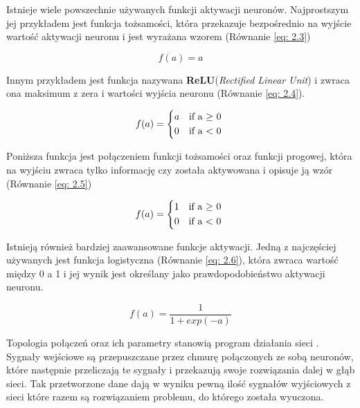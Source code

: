 \documentclass[12pt, oneside, a4paper]{report}
\begin{document}
Istnieje wiele powszechnie używanych funkcji aktywacji neuronów. Najprostszym jej przykładem jest funkcja tożsamości, która przekazuje bezpośrednio na wyjście wartość aktywacji neuronu i jest wyrażana wzorem (Równanie \ref{eq: 2.3})

\begin{equation}\label{eq: 2.3}
  f(a) = a
\end{equation}

Innym przykładem jest funkcja nazywana \textbf{ReLU}(\textit{Rectified Linear Unit}) i zwraca ona maksimum z zera i wartości wyjścia neuronu (Równanie \ref{eq: 2.4}).

\begin{equation}\label{eq: 2.4}
    f(a) =
    \begin{cases*}
      a & if a $\geq$ 0 \\
      0 & if a < 0
    \end{cases*}
\end{equation}

Poniższa funkcja jest połączeniem funkcji tożsamości oraz funkcji progowej, która na wyjściu zwraca tylko informację czy została aktywowana i opisuje ją wzór (Równanie \ref{eq: 2.5})

\begin{equation}\label{eq: 2.5}
  f(a) =
  \begin{cases*}
    1 & if a $\geq$ 0 \\
    0 & if a < 0
  \end{cases*}
\end{equation}

Istnieją również bardziej zaawansowane funkcje aktywacji. Jedną z najczęściej używanych jest funkcja logistyczna (Równanie \ref{eq: 2.6}), która zwraca wartość między 0 a 1 i jej wynik jest określany jako prawdopodobieństwo aktywacji neuronu.

\begin{equation}\label{eq: 2.6}
  f(a) = \frac{1}{1 + exp(-a)}
\end{equation}

Topologia połączeń oraz ich parametry stanowią program działania sieci \citep{tadeusiewicz1993sieci}. Sygnały wejściowe są przepuszczane przez chmurę połączonych ze sobą neuronów, które następnie przeliczają te sygnały i przekazują swoje rozwiązania dalej w głąb sieci. Tak przetworzone dane dają w wyniku pewną ilość sygnałów wyjściowych z sieci które razem są rozwiązaniem problemu, do którego została wyuczona.
\end{document}
